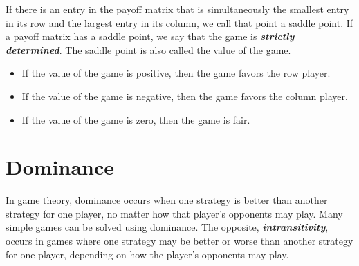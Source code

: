 \documentclass[a4paper,12pt]{article}
\begin{document}
\begin{framed}
	If there is an entry in the payoff matrix that is simultaneously the smallest entry in its row and
	the largest entry in its column, we call that point a saddle point. If a payoff matrix has a saddle point, we say that the game is \textbf{\textit{strictly determined}}. The saddle point is also called the value of the game.
	\begin{itemize}
		\item If the value of the game is positive, then the game favors the row player.
		\item If the value of the game is negative, then the game favors the column player.
		\item If the value of the game is zero, then the game is fair.
	\end{itemize}
\end{framed}

\section{Dominance}
In game theory, dominance occurs when one strategy is better than another strategy for one player, no matter how that player's opponents may play. Many simple games can be solved using dominance. The opposite, \textbf{\textit{intransitivity}}, occurs in games where one strategy may be better or worse than another strategy for one player, depending on how the player's opponents may play.
\newpage
\end{document}
